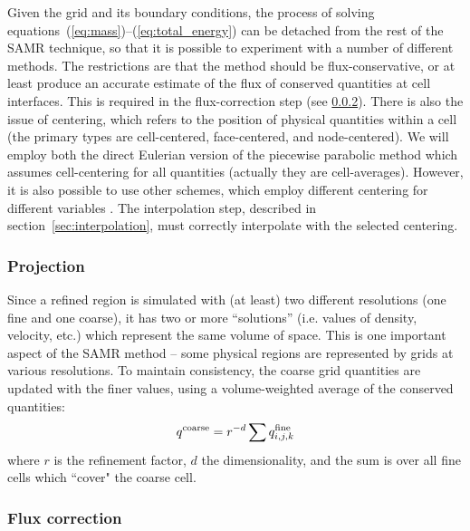 Given the grid and its boundary conditions, the process of solving
equations~(\ref{eq:mass})--(\ref{eq:total_energy}) can be detached
from the rest of the SAMR technique, so that it is possible to
experiment with a number of different methods.  The restrictions are
that the method should be flux-conservative, or at least produce an
accurate estimate of the flux of conserved quantities at cell
interfaces.  This is required in the flux-correction step (see
\ref{sec:flux_correction}).  There is also the issue of centering,
which refers to the position of physical quantities within a cell (the
primary types are cell-centered, face-centered, and node-centered). We
will employ both the direct Eulerian version of the piecewise
parabolic method \citep{1984JCoPh..54..174C,1995CoPhC..89..149B} which
assumes cell-centering for all quantities (actually they are
cell-averages).  However, it is also possible to use other schemes,
which employ different centering for different variables
\citep[e.g.,][]{Stone92a}.  The interpolation step, described in
section~\ref{sec:interpolation}, must correctly interpolate with the
selected centering.

\subsubsection{Projection}
\label{sec:projection}

Since a refined region is simulated with (at least) two different resolutions (one fine and one coarse), it has two or
more ``solutions'' (i.e. values of density, velocity, etc.) which represent the same volume of space.  This is one important aspect of the SAMR method -- some physical regions are represented by grids at various resolutions.  To
maintain consistency, the coarse grid quantities are updated with the finer values, using a volume-weighted average of the conserved quantities:
\begin{equation}
q^{\rm coarse} = r^{-d} \sum q^{\rm fine}_{i, j,k}
\end{equation}
where $r$ is the refinement factor, $d$ the dimensionality, and the sum is over all fine cells which ``cover" the coarse cell.

\subsubsection{Flux correction}
\label{sec:flux_correction}

